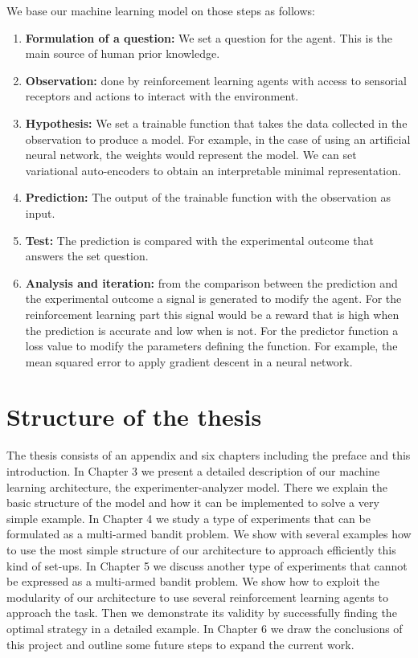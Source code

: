 \documentclass[11pt,a4paper,twoside]{report}
\newcommand{\+}{\textnormal{+} }
\theoremstyle{definition}
\numberwithin{equation}{chapter}
\begin{document}
We base our machine learning model on those steps as follows:

\begin{enumerate}
  \item \textbf{Formulation of a question:} We set a question for the agent.
  This is the main source of human prior knowledge.
  \item \textbf{Observation:} done by reinforcement learning agents with access
  to sensorial receptors and actions to interact with the environment.
  \item  \textbf{Hypothesis:} We set a trainable function that takes the data
  collected in the observation to produce a model. For example, in the case of
  using an artificial neural network, the weights would represent the model. We
  can set variational auto-encoders to obtain an interpretable minimal
  representation.
  \item \textbf{Prediction:} The output of the trainable function with the
  observation as input.
  \item \textbf{Test:} The prediction is compared with the experimental outcome
  that answers the set question.
  \item \textbf{Analysis and iteration:} from the comparison between the
  prediction and the experimental outcome a signal is generated to modify the
  agent. For the reinforcement learning part this signal would be a reward that
  is high when the prediction is accurate and low when is not. For the predictor
  function a loss value to modify the parameters defining the function. For
  example, the mean squared error to apply gradient descent in a neural network.
\end{enumerate}

\section{Structure of the thesis}

The thesis consists of an appendix and six chapters including the preface and
this introduction. In Chapter 3 we present a detailed description of our machine
learning architecture, the experimenter-analyzer model. There we explain the
basic structure of the model and how it can be implemented to solve a very
simple example. In Chapter 4 we study a type of experiments that can be
formulated as a multi-armed bandit problem. We show with several examples how to
use the most simple structure of our architecture to approach efficiently this
kind of set-ups. In Chapter 5 we discuss another type of experiments that cannot
be expressed as a multi-armed bandit problem. We show how to exploit the
modularity of our architecture to use several reinforcement learning agents to
approach the task. Then we demonstrate its validity by successfully finding the
optimal strategy in a detailed example. In Chapter 6 we draw the conclusions of
this project and outline some future steps to expand the current work.
\end{document}
